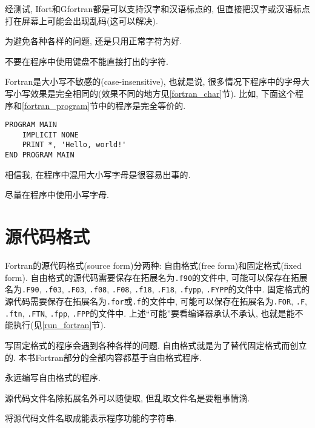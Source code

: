 经测试, Ifort和Gfortran都是可以支持汉字和汉语标点的, 但直接把汉字或汉语标点打在屏幕上可能会出现乱码(这可以解决).

为避免各种各样的问题, 还是只用正常字符为好.

\begin{convention}
    不要在程序中使用键盘不能直接打出的字符.
\end{convention}

Fortran是大小写不敏感的(case-insensitive), 也就是说, 很多情况下程序中的字母大写小写效果是完全相同的(效果不同的地方见\ref{fortran_char}节). 比如, 下面这个程序和\ref{fortran_program}节中的程序是完全等价的.
\begin{lstlisting}
PROGRAM MAIN
    IMPLICIT NONE
    PRINT *, 'Hello, world!'
END PROGRAM MAIN
\end{lstlisting}

相信我, 在程序中混用大小写字母是很容易出事的.

\begin{convention}
    尽量在程序中使用小写字母.
\end{convention}

\section{源代码格式}

Fortran的源代码格式(source form)分两种: 自由格式(free form)和固定格式(fixed form). 自由格式的源代码需要保存在拓展名为\texttt{.f90}的文件中, 可能可以保存在拓展名为\texttt{.F90}, \texttt{.f03}, \texttt{.F03}, \texttt{.f08}, \texttt{.F08}, \texttt{.f18}, \texttt{.F18}, \texttt{.fypp}, \texttt{.FYPP}的文件中. 固定格式的源代码需要保存在拓展名为\texttt{.for}或\texttt{.f}的文件中, 可能可以保存在拓展名为\texttt{.FOR}, \texttt{.F}, \texttt{.ftn}, \texttt{.FTN}, \texttt{.fpp}, \texttt{.FPP}的文件中. 上述``可能''要看编译器承认不承认, 也就是能不能执行(见\ref{run_fortran}节).

写固定格式的程序会遇到各种各样的问题. 自由格式就是为了替代固定格式而创立的. 本书Fortran部分的全部内容都基于自由格式程序.

\begin{convention}
    永远编写自由格式的程序.
\end{convention}

源代码文件名除拓展名外可以随便取, 但乱取文件名是要粗事情滴.

\begin{convention}
    将源代码文件名取成能表示程序功能的字符串.
\end{convention}

